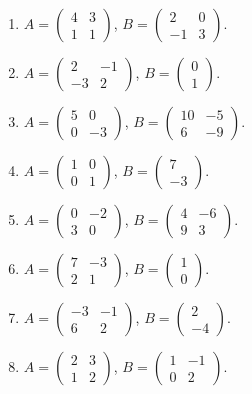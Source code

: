 \begin{enumerate}[label=\arabic*.,  leftmargin=*]
\item $A=\begin{pmatrix}4&3\\1&1\end{pmatrix}$, $B=\begin{pmatrix}2&0\\-1&3\end{pmatrix}$.
\item $A=\begin{pmatrix}2&-1\\-3&2\end{pmatrix}$, $B=\begin{pmatrix}0\\1\end{pmatrix}$.
\item $A=\begin{pmatrix}5&0\\0&-3\end{pmatrix}$, $B=\begin{pmatrix}10&-5\\6&-9\end{pmatrix}$.
\item $A=\begin{pmatrix}1&0\\0&1\end{pmatrix}$, $B=\begin{pmatrix}7\\-3\end{pmatrix}$.
\item $A=\begin{pmatrix}0&-2\\3&0\end{pmatrix}$, $B=\begin{pmatrix}4&-6\\9&3\end{pmatrix}$.
\item $A=\begin{pmatrix}7&-3\\2&1\end{pmatrix}$, $B=\begin{pmatrix}1\\0\end{pmatrix}$.
\item $A=\begin{pmatrix}-3&-1\\6&2\end{pmatrix}$, $B=\begin{pmatrix}2\\-4\end{pmatrix}$.
\item $A=\begin{pmatrix}2&3\\1&2\end{pmatrix}$, $B=\begin{pmatrix}1&-1\\0&2\end{pmatrix}$.

\end{enumerate}

